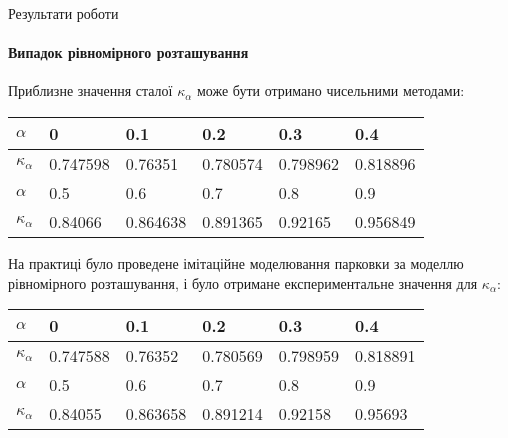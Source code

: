 \begin{frame}{Результати роботи}
	\framesubtitle{Випадок рівномірного розташування}
	Приблизне значення сталої $\kappa_\alpha$ може бути отримано чисельними методами:
\begin{table}
	\centering
	\scriptsize
\begin{tabular}{|p{}|p{}|p{}|p{}|p{}|p{}|}
	\hline
	$\alpha$ & 0 & 0.1 & 0.2 & 0.3 & 0.4 \\
	\hline
	$\kappa_\alpha$ & 0.747598 &0.76351 &0.780574 &0.798962 &0.818896  \\
	\hline
	\hline
	$\alpha$  & 0.5 & 0.6 & 0.7 & 0.8 & 0.9\\
	\hline
	$\kappa_\alpha$  &0.84066 &0.864638 &0.891365 &0.92165 &0.956849 \\
	\hline
\end{tabular}
\end{table}

	На практиці було проведене імітаційне моделювання парковки за моделлю рівномірного розташування, і було отримане експериментальне значення для $\kappa_\alpha$:
\begin{table}
	\centering
	\scriptsize
\begin{tabular}{|p{}|p{}|p{}|p{}|p{}|p{}|}
	\hline
	$\alpha$ & 0 & 0.1 & 0.2 & 0.3 & 0.4 \\
	\hline
	$\kappa_\alpha$ & 0.747588 &0.76352 &0.780569 &0.798959 &0.818891  \\
	\hline
	\hline
	$\alpha$  & 0.5 & 0.6 & 0.7 & 0.8 & 0.9\\
	\hline
	$\kappa_\alpha$  &0.84055 &0.863658 &0.891214 &0.92158 &0.95693 \\
	\hline
\end{tabular}
\end{table}
\end{frame}



